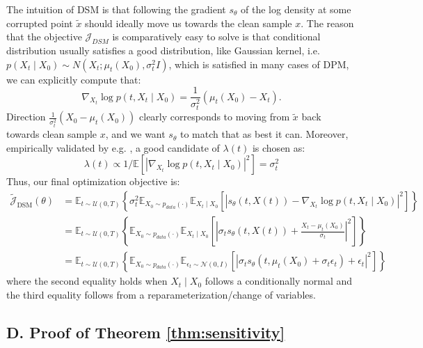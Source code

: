 \documentclass[letterpaper,10pt,reqno]{amsart}
\numberwithin{equation}{section}
\begin{document}
\quad The intuition of DSM is that following the gradient $s_{\theta}$ of the log density at some corrupted point $\tilde{x}$ should ideally move us towards the clean sample $x$. The reason that the objective $\mathcal{J}_{DSM}$ is comparatively easy to solve is that conditional distribution usually satisfies a good distribution, like Gaussian kernel, i.e. $p(X_t \mid X_0) \sim N\left(X_t ; \mu_{t}(X_0), \sigma_t^2 I\right)$, which is satisfied in many cases of DPM, we can explicitly compute that:
$$
\nabla_{X_t} \log p(t,X_t \mid X_0)=\frac{1}{\sigma_t^2}(\mu_{t}(X_0)-X_t) .
$$
Direction $\frac{1}{\sigma_t^2}(X_0-\mu_{t}(X_0))$ clearly corresponds to moving from $\tilde{x}$ back towards clean sample $x$, and we want $s_{\theta}$ to match that as best it can. Moreover,  empirically validated by e.g. \cite{Song20}, a good candidate of $\lambda(t)$ is chosen as:
$$
\lambda(t) \propto 1 / \mathbb{E}\left[\left|\nabla_{X_t} \log p(t,X_t \mid X_0)\right|^2\right]=\sigma_t^2
$$
Thus, our final optimization objective is:
$$
\begin{aligned}
\tilde{\mathcal{J}}_{\text{DSM}}(\theta)&=\mathbb{E}_{t\sim\mathcal{U}(0, T)}\left\{\sigma_t^2 \mathbb{E}_{X_0\sim p_{data}(\cdot)} \mathbb{E}_{X_t \mid X_0}\left[\left|s_{\theta}(t,X(t))-\nabla_{X_t} \log p(t,X_t \mid X_0)\right|^2\right]\right\}\\
& = \mathbb{E}_{t\sim\mathcal{U}(0, T)}\left\{ \mathbb{E}_{X_0\sim p_{data}(\cdot)} \mathbb{E}_{X_t \mid X_0}\left[\left|\sigma_t s_{\theta}(t,X(t))+\frac{X_t-\mu_{t}(X_0)}{\sigma_t}\right|^2\right]\right\}\\
& = \mathbb{E}_{t\sim\mathcal{U}(0, T)}\left\{ \mathbb{E}_{X_0\sim p_{data}(\cdot)} \mathbb{E}_{\epsilon_t\sim\mathcal{N}(0,I)}\left[\left|\sigma_t s_{\theta}(t,\mu_{t}(X_0)+\sigma_t\epsilon_t)+\epsilon_t\right|^2\right]\right\}
\end{aligned}
$$
where the second equality holds when $X_t\mid X_0$ follows a conditionally normal and the third equality follows from a reparameterization/change of variables.


\subsection*{D. Proof of Theorem \ref{thm:sensitivity}}
\end{document}
